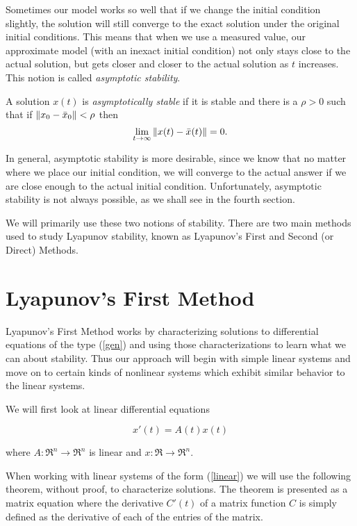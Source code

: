 \documentclass[nols]{tufte-handout}
\theoremstyle{definition}
\begin{document}
Sometimes our model works so well that if we change the initial
condition slightly, the solution will still converge to the exact
solution under the original initial conditions.  This means that when
we use a measured value, our approximate model (with an inexact
initial condition) not only stays close to the actual solution, but
gets closer and closer to the actual solution as $t$ increases.  This
notion is called {\em asymptotic stability}.

\begin{dfn}
	A solution $x(t)$ is {\em asymptotically stable} if it is stable
	and there is a $\rho > 0$ such that if $\| x_0 - \bar{x}_0 \| < \rho$
	then 
$$\lim_{t \rightarrow \infty} \| x(t) - \bar{x}(t) \| = 0.$$
\end{dfn}

In general, asymptotic stability is more desirable, since we know that
no matter where we place our initial condition, we will converge to
the actual answer if we are close enough to the actual initial
condition.  Unfortunately, asymptotic stability is not always
possible, as we shall see in the fourth section.

We will primarily use these two notions of stability.  There
are two main methods used to study Lyapunov stability, known
as Lyapunov's First and Second (or Direct) Methods.

\section {Lyapunov's First Method}

Lyapunov's First Method works by characterizing solutions to
differential equations of the type (\ref{gen}) and using those
characterizations to learn what we can about stability.  Thus our
approach will begin with simple linear systems and move on to certain
kinds of nonlinear systems which exhibit similar behavior to the
linear systems.

We will first look at linear differential equations 

\begin{equation}
	x'(t) = A(t)x(t)
    \label{linear}
\end{equation}

where $A: \Re ^n \rightarrow \Re ^n$ is linear and $x: \Re \rightarrow \Re^n.$

When working with linear systems of the form (\ref{linear}) we will
use the following theorem, without proof, to characterize solutions.
The theorem is presented as a matrix equation where the derivative
$C'(t)$ of a matrix function $C$ is simply defined as the derivative
of each of the entries of the matrix.
\end{document}
